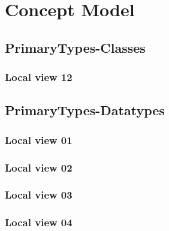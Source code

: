 
\chapter{Concept Model}
\label{chap:lu.uni.lassy.excalibur.group09.spec-CM}


\section{PrimaryTypes-Classes}
\subsection{Local view 12}
\label{sec:lu.uni.lassy.excalibur.group09.spec-CM-view-local-PrimaryTypes-Classes-12}




\section{PrimaryTypes-Datatypes}
\subsection{Local view 01}
\label{sec:lu.uni.lassy.excalibur.group09.spec-CM-view-local-PrimaryTypes-Datatypes-01}

\subsection{Local view 02}
\label{sec:lu.uni.lassy.excalibur.group09.spec-CM-view-local-PrimaryTypes-Datatypes-02}

\subsection{Local view 03}
\label{sec:lu.uni.lassy.excalibur.group09.spec-CM-view-local-PrimaryTypes-Datatypes-03}

\subsection{Local view 04}
\label{sec:lu.uni.lassy.excalibur.group09.spec-CM-view-local-PrimaryTypes-Datatypes-04}

